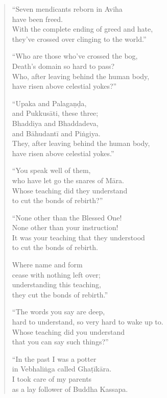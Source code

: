 \documentclass[12pt,openany]{book}%
\begin{document}
\begin{verse}%
“Seven mendicants reborn in Aviha \\
have been freed. \\
With the complete ending of greed and hate, \\
they’ve crossed over clinging to the world.” 

“Who are those who’ve crossed the bog, \\
Death’s domain so hard to pass? \\
Who, after leaving behind the human body, \\
have risen above celestial yokes?” 

“Upaka and \textsanskrit{Palagaṇḍa}, \\
and \textsanskrit{Pukkusāti}, these three; \\
Bhaddiya and Bhaddadeva, \\
and \textsanskrit{Bāhudantī} and \textsanskrit{Piṅgiya}. \\
They, after leaving behind the human body, \\
have risen above celestial yokes.” 

“You speak well of them, \\
who have let go the snares of \textsanskrit{Māra}. \\
Whose teaching did they understand \\
to cut the bonds of rebirth?” 

“None other than the Blessed One! \\
None other than your instruction! \\
It was your teaching that they understood \\
to cut the bonds of rebirth. 

Where name and form \\
cease with nothing left over; \\
understanding this teaching, \\
they cut the bonds of rebirth.” 

“The words you say are deep, \\
hard to understand, so very hard to wake up to. \\
Whose teaching did you understand \\
that you can say such things?” 

“In the past I was a potter \\
in \textsanskrit{Vebhaliṅga} called \textsanskrit{Ghaṭīkāra}. \\
I took care of my parents \\
as a lay follower of Buddha Kassapa. 


\end{verse}
\end{document}
